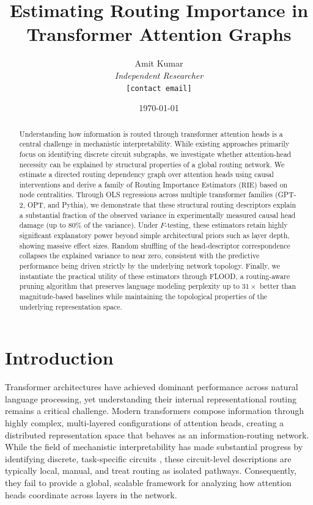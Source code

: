 \documentclass[11pt,a4paper]{article}
\title{%
    \LARGE\textbf{Estimating Routing Importance in Transformer Attention Graphs}%
}
\author{%
    Amit Kumar\\[2pt]
    \small\textit{Independent Researcher}\\
    \small\texttt{[contact email]}%
}
\date{\today}
\newcommand{\rie}{\text{RIE}}
\theoremstyle{definition}
\theoremstyle{plain}
\begin{document}
\maketitle
\thispagestyle{empty}

\begin{abstract}
\noindent
Understanding how information is routed through transformer attention heads is a central challenge in mechanistic interpretability. While existing approaches primarily focus on identifying discrete circuit subgraphs, we investigate whether attention-head necessity can be explained by structural properties of a global routing network. We estimate a directed routing dependency graph over attention heads using causal interventions and derive a family of Routing Importance Estimators ($\rie$) based on node centralities. Through OLS regressions across multiple transformer families (GPT-2, OPT, and Pythia), we demonstrate that these structural routing descriptors explain a substantial fraction of the observed variance in experimentally measured causal head damage (up to 80\% of the variance). Under $F$-testing, these estimators retain highly significant explanatory power beyond simple architectural priors such as layer depth, showing massive effect sizes. Random shuffling of the head-descriptor correspondence collapses the explained variance to near zero, consistent with the predictive performance being driven strictly by the underlying network topology. Finally, we instantiate the practical utility of these estimators through FLOOD, a routing-aware pruning algorithm that preserves language modeling perplexity up to $31\times$ better than magnitude-based baselines while maintaining the topological properties of the underlying representation space.
\end{abstract}

\newpage
\setcounter{page}{1}
\tableofcontents
\vspace{2em}

\section{Introduction}
\label{sec:intro}

Transformer architectures have achieved dominant performance across natural language processing, yet understanding their internal representational routing remains a critical challenge. Modern transformers compose information through highly complex, multi-layered configurations of attention heads, creating a distributed representation space that behaves as an information-routing network. While the field of mechanistic interpretability has made substantial progress by identifying discrete, task-specific circuits \citep{elhage2021mathematical, olsson2022induction}, these circuit-level descriptions are typically local, manual, and treat routing as isolated pathways. Consequently, they fail to provide a global, scalable framework for analyzing how attention heads coordinate across layers in the network.
\end{document}
